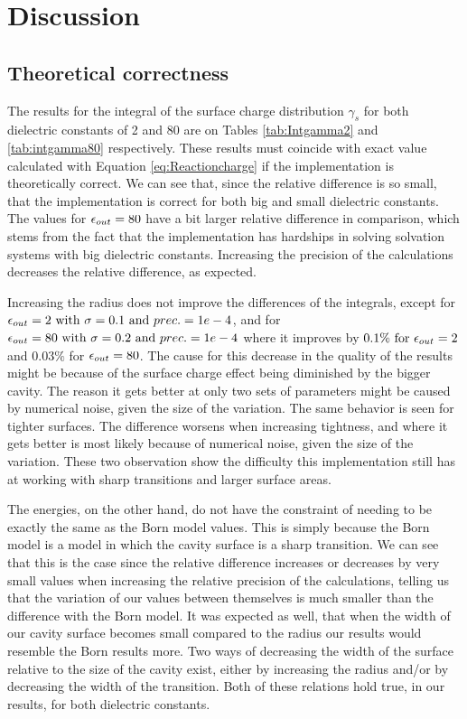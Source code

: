 \documentclass[../Thesis.tex]{subfiles}
\begin{document}
\section{Discussion}
\subsection{Theoretical correctness }
The results for the integral of the surface charge distribution $\gamma_s$ for
both dielectric constants of 2 and 80 are on Tables \ref{tab:Intgamma2} and \ref{tab:intgamma80}
respectively. These results must coincide with  exact value calculated with Equation \ref{eq:Reactioncharge}
if the implementation is theoretically correct. We can see that, since the relative difference is
so small, that the implementation is correct for both big and small dielectric constants.
The values for $\epsilon_{out} = 80$ have a bit larger relative difference in comparison, which stems from
the fact that the implementation has hardships in solving solvation systems with big dielectric constants.
Increasing the precision of the calculations decreases the relative difference, as expected.

Increasing the radius does not improve the differences of the integrals, except for
$\epsilon_{out} = 2 \text{ with } \sigma = 0.1 \text{ and } prec. = 1e-4$, and for
$\epsilon_{out} = 80 \text{ with } \sigma = 0.2 \text{ and } prec. = 1e-4$ where it improves by
$0.1\% \text{ for } \epsilon_{out} = 2$ and $0.03\%$ for $\epsilon_{out} = 80$. The cause for
this decrease in the quality of the \mrchem results might be because of the surface
charge effect being diminished by the bigger cavity. The reason it gets better at
only two sets of parameters might be caused by numerical noise, given the size of
the variation.
The same  behavior is seen for tighter surfaces. The difference worsens
when increasing tightness, and where it gets better is most likely because of numerical noise,
given the size of the variation. These two observation show the difficulty this implementation still
has at working with sharp transitions and larger surface areas.

The energies, on the other hand, do not have the constraint of needing to be exactly the same as
the Born model values. This is simply because the Born model is a model in which
the cavity surface is a sharp transition. We can see that this is the case since the
relative difference increases or decreases by very small  values when increasing the
relative precision of the calculations, telling us that
the variation of our values between themselves is much smaller than  the difference
with the Born model.
It was expected as well, that when the width of our cavity surface becomes small
compared to the radius our results would resemble
the Born results more. Two ways of decreasing the width of the surface relative to the
size of the cavity exist, either by increasing the  radius and/or by decreasing the width of the transition.
Both of these relations hold true, in our results, for both dielectric constants.
\end{document}
